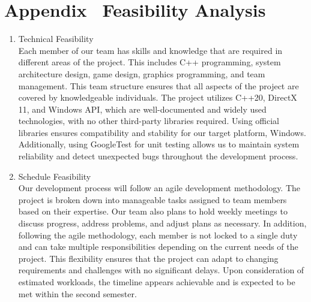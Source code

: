 \section*{Appendix \thesection \, \textbar \vspace{0.5em} Feasibility Analysis}
\label{sec:appendix-feasibility}
%

\begin{enumerate}
    \item Technical Feasibility\\
    Each member of our team has skills and knowledge that are required in different areas of the project.
    This includes C++ programming, system architecture design, game design, graphics programming, and team management.
    This team structure ensures that all aspects of the project are covered by knowledgeable individuals.
    The project utilizes C++20, DirectX 11, and Windows API, which are well-documented and widely used technologies, with no other third-party libraries required.
    Using official libraries ensures compatibility and stability for our target platform, Windows.
    Additionally, using GoogleTest for unit testing allows us to maintain system reliability and detect unexpected bugs throughout the development process.

    \item Schedule Feasibility\\
    Our development process will follow an agile development methodology.
    The project is broken down into manageable tasks assigned to team members based on their expertise.
    Our team also plans to hold weekly meetings to discuss progress, address problems, and adjust plans as necessary.
    In addition, following the agile methodology, each member is not locked to a single duty and can take multiple responsibilities depending on the current needs of the project.
    This flexibility ensures that the project can adapt to changing requirements and challenges with no significant delays.
    Upon consideration of estimated workloads, the timeline appears achievable and is expected to be met within the second semester.


\end{enumerate}
